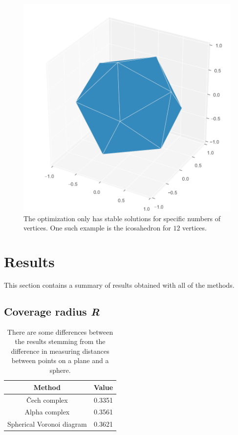 \documentclass[twocolumn]{article}
\begin{document}
\begin{figure}[H]
    \centering
    \includegraphics[width=\columnwidth]{fig/icosahedron}
    \caption{The optimization only has stable solutions for specific numbers of vertices. One such example is the icosahedron for $12$ vertices.}
    \label{fig:icosahedron}
\end{figure}

\section{Results}
This section contains a summary of results obtained with all of the methods.

\subsection{Coverage radius \textit{R}}
\begin{table}[h]
    \centering
    \begin{tabular}{c|c}
        Method & Value  \\
        \hline
         Čech complex & 0.3351 \\
         Alpha complex & 0.3561 \\
         Spherical Voronoi diagram & 0.3621 \\
    \end{tabular}
    \caption{There are some differences between the results stemming from the difference in measuring distances between points on a plane and a sphere.}
    \label{tab:R}
\end{table}
\end{document}
